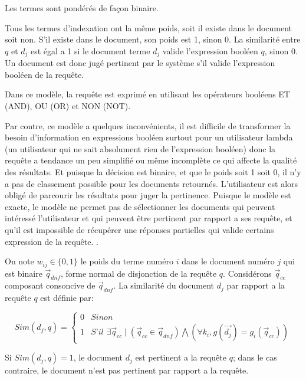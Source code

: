 Les termes sont pondérés de façon binaire.

Tous les termes d'indexation ont la même poids, soit il existe dans le document soit non. S'il existe dans le document, son poids est 1, sinon 0. La similarité entre $q$ et $d_{j}$ est égal a 1 si le document terme $d_{j}$ valide l'expression booléen $q$, sinon 0. Un document est donc jugé pertinent par le système s'il valide l'expression booléen de la requête.

Dans ce modèle, la requête est exprimé en utilisant les opérateurs booléens ET (AND), OU (OR) et NON (NOT).

Par contre, ce modèle a quelques inconvénients, il est difficile de transformer la besoin d'information en expressions booléen surtout pour un utilisateur lambda (un utilisateur qui ne sait absolument rien de l'expression booléen) donc la requête a tendance un peu simplifié ou même incomplète ce qui affecte la qualité des résultats. Et puisque la décision est binaire, et que le poids soit 1 soit 0, il n'y a pas de classement possible pour les documents retournés. L'utilisateur est alors obligé de parcourir les résultats pour juger la pertinence. Puisque le modèle est exacte, le modèle ne permet pas de sélectionner les documents qui peuvent intéressé l'utilisateur et qui peuvent être pertinent par rapport a ses requête, et qu'il est impossible de récupérer une réponses partielles qui valide certains expression de la requête. \citep*{modern-ir, soulier2014:def-evaluation-modele}.

\begin{definition}
    On note $w_{ij} \in \{0, 1\}$ le poids du terme numéro $i$ dans le document numéro $j$ qui est binaire $ \vec{q}_{dnf} $, forme normal de disjonction de la requête $ q $. Considérons $ \vec{q}_{cc} $ composant consoncive de $ \vec{q}_{dnf} $. La similarité du document $ d_{j} $ par rapport a la requête $ q $ est définie par:

    \[
        Sim(d_{j}, q) = \left\{
        \begin{array}{ll}
            0 & Sinon \\
            1 & \textit{S'il } \exists \vec{q}_{cc} \mid (\vec{q}_{cc} \in \vec{q}_{dnf}) \bigwedge (\forall k_{i}, g(\vec{d_{j}}) = g_{i}(\vec{q}_{cc}))
        \end{array}
        \right.
    \]

    Si $ Sim(d_{j}, q) = 1$, le document $ d_{j} $ est pertinent a la requête $ q $; dans le cas contraire, le document n'est pas pertinent par rapport a la requête.
\end{definition}

